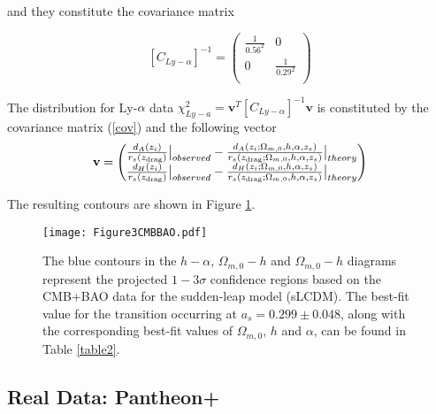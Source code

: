 \documentclass[universe,article,accept,moreauthors,pdftex]{Definitions/mdpi}
\begin{document}
 

and they constitute  the covariance matrix 
 
 \begin{equation}\label{cov}
 [C_{Ly-\alpha}]^{-1}=
 \begin{pmatrix}
  \frac{1}{0.56^{2}} & 0  \\
  0 & \frac{1}{0.29^{2}}  \\
 
 \end{pmatrix}
 \end{equation} 

 
  The distribution for Ly-$\alpha$ data $\chi^{2}_{Ly-a}=\textbf{v}^{T}[C_{Ly-\alpha}]^{-1}\textbf{v}$ is constituted by the covariance matrix (\ref{cov}) and the following vector \cite{Theodoropoulos:2021hkk}  
\begin{equation}\textbf{v} = 
 \begin{pmatrix}
\frac{d_{A}(z_{i})}{r_{s}(z_{\text{drag}})}\big{|}_{observed}-\frac{d_{A}(z_{i};\Omega_{m,0},h,\alpha,z_{s})}{r_{s}(z_{\text{drag}};\Omega_{m,0},h,\alpha,z_{s})}\big{|}_{theory} \\
 \frac{d_{H}(z_{i})}{r_{s}(z_{\text{drag}})}\big{|}_{observed}-\frac{d_{H}(z_{i};\Omega_{m,0},h,\alpha,z_{s})}{r_{s}(z_{\text{drag}};\Omega_{m,0},h,\alpha,z_{s})}\big{|}_{theory}
 \end{pmatrix}\end{equation}


 The resulting contours are shown in Figure \ref{Data3}.

 
  \begin{figure}[H] 
    \texttt{[image: Figure3CMBBAO.pdf]}
    \caption{The blue contours in the $h-\alpha$, $\Omega_{m,0}-h$ and $\Omega_{m,0}-h$ diagrams represent the projected $1-3\sigma$ confidence regions based on the CMB+BAO data for the sudden-leap model (sLCDM). The best-fit value for the transition occurring at $a_{s}=0.299\pm0.048$, along with the corresponding best-fit values of $\Omega_{m,0}$, $h$ and $\alpha$, can be found in Table \ref{table2}.}
    \label{Data3}
\end{figure}

 


 \subsection{Real Data: Pantheon+}\label{subsec:3.3}
\end{document}
